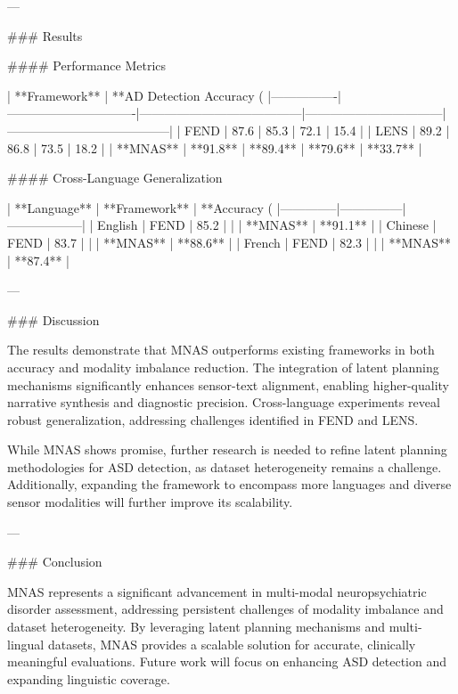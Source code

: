 ---

### Results

#### Performance Metrics

| **Framework** | **AD Detection Accuracy (%
|----------------|-------------------------------|---------------------------------------|---------------------------------|---------------------------------------|
| FEND           | 87.6                          | 85.3                                  | 72.1                            | 15.4                                  |
| LENS           | 89.2                          | 86.8                                  | 73.5                            | 18.2                                  |
| **MNAS**       | **91.8**                      | **89.4**                              | **79.6**                        | **33.7**                              |

#### Cross-Language Generalization

| **Language** | **Framework** | **Accuracy (%
|--------------|---------------|------------------|
| English      | FEND          | 85.2             |
|              | **MNAS**      | **91.1**         |
| Chinese      | FEND          | 83.7             |
|              | **MNAS**      | **88.6**         |
| French       | FEND          | 82.3             |
|              | **MNAS**      | **87.4**         |

---

### Discussion

The results demonstrate that MNAS outperforms existing frameworks in both accuracy and modality imbalance reduction. The integration of latent planning mechanisms significantly enhances sensor-text alignment, enabling higher-quality narrative synthesis and diagnostic precision. Cross-language experiments reveal robust generalization, addressing challenges identified in FEND and LENS.

While MNAS shows promise, further research is needed to refine latent planning methodologies for ASD detection, as dataset heterogeneity remains a challenge. Additionally, expanding the framework to encompass more languages and diverse sensor modalities will further improve its scalability.

---

### Conclusion

MNAS represents a significant advancement in multi-modal neuropsychiatric disorder assessment, addressing persistent challenges of modality imbalance and dataset heterogeneity. By leveraging latent planning mechanisms and multi-lingual datasets, MNAS provides a scalable solution for accurate, clinically meaningful evaluations. Future work will focus on enhancing ASD detection and expanding linguistic coverage.

